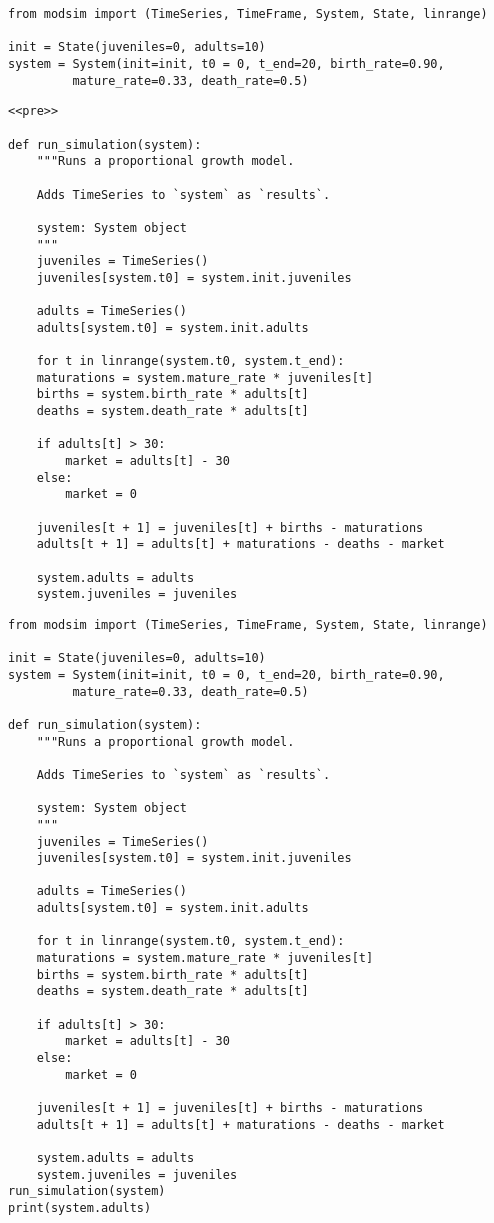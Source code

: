 \documentclass[11pt]{article}
\author{Kawin Nikomborirak}
\date{\today}
\title{}
\begin{document}
\tableofcontents

\begin{verbatim}
from modsim import (TimeSeries, TimeFrame, System, State, linrange)

init = State(juveniles=0, adults=10)
system = System(init=init, t0 = 0, t_end=20, birth_rate=0.90,
		 mature_rate=0.33, death_rate=0.5)
\end{verbatim}

\begin{verbatim}
<<pre>>

def run_simulation(system):
    """Runs a proportional growth model.

    Adds TimeSeries to `system` as `results`.

    system: System object
    """
    juveniles = TimeSeries()
    juveniles[system.t0] = system.init.juveniles

    adults = TimeSeries()
    adults[system.t0] = system.init.adults

    for t in linrange(system.t0, system.t_end):
	maturations = system.mature_rate * juveniles[t]
	births = system.birth_rate * adults[t]
	deaths = system.death_rate * adults[t]

	if adults[t] > 30:
	    market = adults[t] - 30
	else:
	    market = 0

	juveniles[t + 1] = juveniles[t] + births - maturations
	adults[t + 1] = adults[t] + maturations - deaths - market

    system.adults = adults
    system.juveniles = juveniles
\end{verbatim}

\begin{verbatim}
from modsim import (TimeSeries, TimeFrame, System, State, linrange)

init = State(juveniles=0, adults=10)
system = System(init=init, t0 = 0, t_end=20, birth_rate=0.90,
		 mature_rate=0.33, death_rate=0.5)

def run_simulation(system):
    """Runs a proportional growth model.

    Adds TimeSeries to `system` as `results`.

    system: System object
    """
    juveniles = TimeSeries()
    juveniles[system.t0] = system.init.juveniles

    adults = TimeSeries()
    adults[system.t0] = system.init.adults

    for t in linrange(system.t0, system.t_end):
	maturations = system.mature_rate * juveniles[t]
	births = system.birth_rate * adults[t]
	deaths = system.death_rate * adults[t]

	if adults[t] > 30:
	    market = adults[t] - 30
	else:
	    market = 0

	juveniles[t + 1] = juveniles[t] + births - maturations
	adults[t + 1] = adults[t] + maturations - deaths - market

    system.adults = adults
    system.juveniles = juveniles
run_simulation(system)
print(system.adults)
\end{verbatim}
\end{document}
